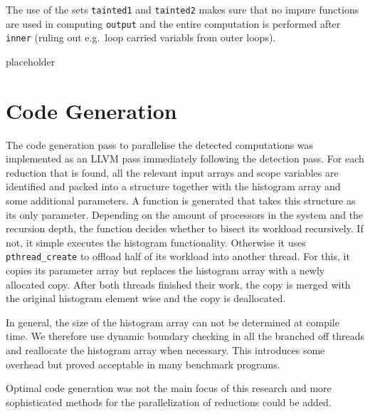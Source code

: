     The use of the sets \texttt{tainted1} and \texttt{tainted2} makes sure that
    no impure functions are used in computing \texttt{output} and the entire
    computation is performed after \texttt{inner} (ruling out e.g.\ loop carried
    variabls from outer loops).


\newpage

placeholder

\newpage
\section{Code Generation}

    The code generation pass to parallelise the detected computations was
    implemented as an LLVM pass immediately following the detection pass.
    For each reduction that is found, all the relevant input arrays and scope
    variables are identified and packed into a structure together with the
    histogram array and some additional parameters.
    A function is generated that takes this structure as its only parameter.
    Depending on the amount of processors in the system and the recursion
    depth, the function decides whether to bisect its workload recursively.
    If not, it simple executes the histogram functionality.
    Otherwise it uses \texttt{pthread\_create} to offload half of its
    workload into another thread.
    For this, it copies its parameter array but replaces the histogram array
    with a newly allocated copy.
    After both threads finished their work, the copy is merged with the original
    histogram element wise and the copy is deallocated.

    In general, the size of the histogram array can not be determined at
    compile time.
    We therefore use dynamic boundary checking in all the branched off threads
    and reallocate the histogram array when necessary.
    This introduces some overhead but proved acceptable in many benchmark
    programs.

    Optimal code generation was not the main focus of this research and more
    sophisticated methods for the parallelization of reductions could be added.

